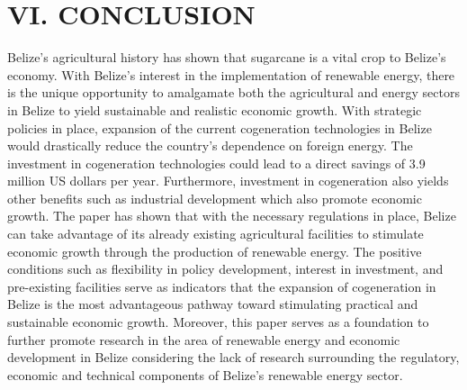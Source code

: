 \documentclass[twocolumn,10pt]{asme2e}
\begin{document}
\section*{VI. CONCLUSION}

Belize's agricultural history has shown that sugarcane is a vital crop to Belize's economy. With Belize's interest in the implementation of renewable energy, there is the unique opportunity to amalgamate both the agricultural and energy sectors in Belize to yield sustainable and realistic economic growth. With strategic policies in place, expansion of the current cogeneration technologies in Belize would drastically reduce the country's dependence on foreign energy. The investment in cogeneration technologies could lead to a direct savings of 3.9 million US dollars per year. Furthermore, investment in cogeneration also yields other benefits such as industrial development which also promote economic growth. The paper has shown that with the necessary regulations in place, Belize can take advantage of its already existing agricultural facilities to stimulate economic growth through the production of renewable energy. The positive conditions such as flexibility in policy development, interest in investment, and pre-existing facilities serve as indicators that the expansion of cogeneration in Belize is the most advantageous pathway toward stimulating practical and sustainable economic growth.  Moreover, this paper serves as a foundation to further promote research in the area of renewable energy and economic development in Belize considering the lack of research surrounding the regulatory, economic and technical components of Belize's renewable energy sector.












%


\end{document}
